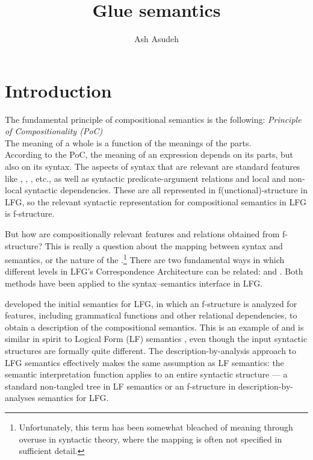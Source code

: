 \documentclass[output=paper,hidelinks]{langscibook}
\title{Glue semantics}
\author{Ash Asudeh\affiliation{University of Rochester}}
\begin{document}
\maketitle
\label{chap:Glue}

\section{Introduction}
\label{sec:introduction}
\label{sec:intro}

The fundamental principle of compositional semantics is the following:
\ea
\textit{Principle of Compositionality (PoC)}\\
  The meaning of a whole is a function of the meanings of the
  parts.\\ \citep{partee95}
\z
%
According to the PoC, the meaning of an expression depends on its parts, but also
on its syntax. The aspects of syntax that are relevant are standard features like
\NUM, \PERS, \TENSE, etc., as well as syntactic
predicate-argument relations and local and non-local syntactic
dependencies. These are all represented in f(unctional)-structure in
LFG, so the relevant syntactic representation for compositional
semantics  in LFG is f-structure. 

But how are compositionally relevant features and relations obtained
from f-structure? This is really a question about the mapping between
syntax and semantics, or the nature of the 
.\footnote{Unfortunately, this term
  has been somewhat bleached of meaning through overuse in syntactic
  theory, where the mapping is often  not specified in sufficient detail.} 
There are two fundamental ways in which different levels in LFG's
Correspondence Architecture \citep{kaplan1987three,kaplan1995formal} can be related:  and . Both methods have been
applied to the syntax--semantics interface in LFG.

\begin{sloppypar}
  \citet{halvorsen83} developed the initial semantics for LFG, in
  which an f-structure is analyzed for features, including grammatical
  functions and other relational dependencies, to obtain a description
  of the compositional semantics. This is an example of
   \citep{HalvorsenKaplan1988,kaplan1995formal}
  and is similar in spirit to Logical Form (LF) semantics
  \citep{heim1998semantics}, even though the input syntactic structures
  are formally quite different. The description-by-analysis approach
  to LFG semantics effectively makes the same assumption as LF
  semantics: the semantic interpretation function applies to an entire
  syntactic structure --- a standard non-tangled tree in LF semantics
  or an f-structure in description-by-analyses semantics for LFG.
\end{sloppypar}
\end{document}
